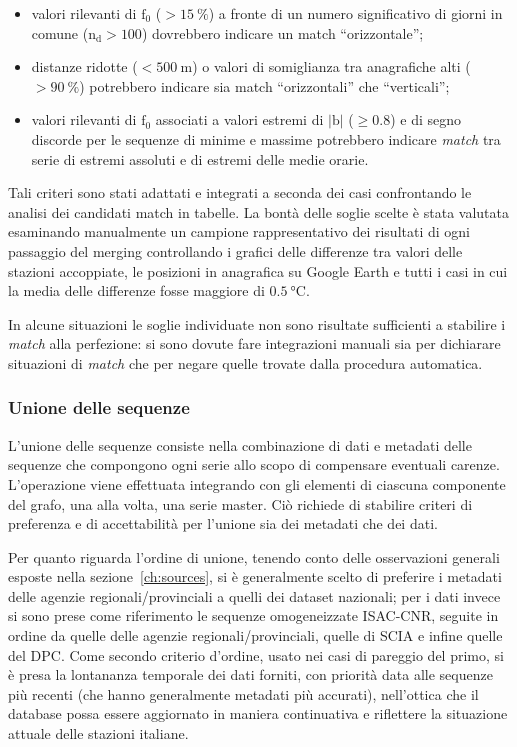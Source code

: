 \begin{itemize}
  \item
    valori rilevanti di \(\mathrm{f}_0\) (\(> \qty{15}{\percent}\)) a fronte di un numero significativo di giorni in comune (\(\mathrm{n_d} > 100\)) dovrebbero indicare un match ``orizzontale'';
  \item
    distanze ridotte (\(< 500\:\mathrm{m}\)) o valori di somiglianza tra anagrafiche alti (\(> \qty{90}{\percent}\)) potrebbero indicare sia match ``orizzontali'' che ``verticali'';
  \item
    valori rilevanti di \(\mathrm{f}_0\) associati a valori estremi di \(|\mathrm{b}|\) (\(\ge 0.8\)) e di segno discorde per le sequenze di minime e massime potrebbero indicare \emph{match} tra serie di estremi assoluti e di estremi delle medie orarie.
\end{itemize}

Tali criteri sono stati adattati e integrati a seconda dei casi confrontando le analisi dei candidati match in tabelle. La bontà delle soglie scelte è stata valutata esaminando manualmente un campione rappresentativo dei risultati di ogni passaggio del merging controllando i grafici delle differenze tra valori delle stazioni accoppiate, le posizioni in anagrafica su Google Earth e tutti i casi in cui la media delle differenze fosse maggiore di \(\qty{0.5}{\degreeCelsius}\).

In alcune situazioni le soglie individuate non sono risultate sufficienti a stabilire i \emph{match} alla perfezione: si sono dovute fare integrazioni manuali sia per dichiarare situazioni di \emph{match} che per negare quelle trovate dalla procedura automatica.

\subsubsection{Unione delle sequenze}
L'unione delle sequenze consiste nella combinazione di dati e metadati delle sequenze che compongono ogni serie allo scopo di compensare eventuali carenze. L'operazione viene effettuata integrando con gli elementi di ciascuna componente del grafo, una alla volta, una serie master. Ciò richiede di stabilire criteri di preferenza e di accettabilità per l'unione sia dei metadati che dei dati.

Per quanto riguarda l'ordine di unione, tenendo conto delle osservazioni generali esposte nella sezione~\ref{ch:sources}, si è generalmente scelto di preferire i metadati delle agenzie regionali/provinciali a quelli dei dataset nazionali; per i dati invece si sono prese come riferimento le sequenze omogeneizzate ISAC-CNR, seguite in ordine da quelle delle agenzie regionali/provinciali, quelle di SCIA e infine quelle del DPC. Come secondo criterio d'ordine, usato nei casi di pareggio del primo, si è presa la lontananza temporale dei dati forniti, con priorità data alle sequenze più recenti (che hanno generalmente metadati più accurati), nell'ottica che il database possa essere aggiornato in maniera continuativa e riflettere la situazione attuale delle stazioni italiane.

